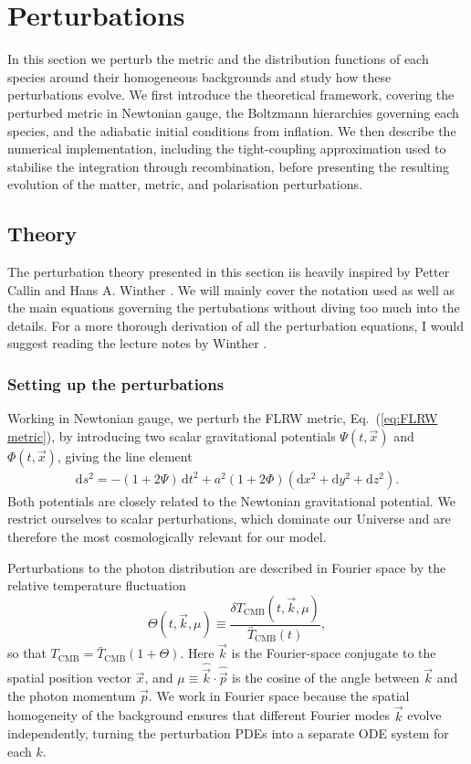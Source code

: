 \documentclass[twocolumn]{aa}
\renewcommand{\d}{\text{d}}
\begin{document}
\section{Perturbations}

 In this section we perturb the metric and the distribution functions of each species around their homogeneous backgrounds and study how these perturbations evolve. We first introduce the theoretical framework, covering the perturbed metric in Newtonian gauge, the Boltzmann hierarchies governing each species, and the adiabatic initial conditions from inflation. We then describe the numerical implementation, including the tight-coupling approximation used to stabilise the integration through recombination, before presenting the resulting evolution of the matter, metric, and polarisation perturbations.


\subsection{Theory}
The perturbation theory presented in this section iis heavily inspired by Petter Callin and Hans A. Winther \citep{callin2006,winther_milestone3,winther_lectures}. We will mainly cover the notation used as well as the main equations governing the pertubations without diving too much into the details. For a more thorough derivation of all the perturbation equations, I would suggest reading the lecture notes by Winther \citep{winther_lectures}.

\subsubsection{Setting up the perturbations}


Working in Newtonian gauge, we perturb the FLRW metric, Eq.~(\ref{eq:FLRW metric}), by introducing two scalar gravitational potentials $\Psi(t,\vec{x})$ and $\Phi(t,\vec{x})$, giving the line element
\begin{align}
    \d s^2 = -(1+2\Psi)\,\d t^2 + a^2(1+2\Phi)\left(\d x^2 + \d y^2 + \d z^2\right).
    \label{eq:pert metric}
\end{align}
Both potentials are closely related to the Newtonian gravitational potential. We restrict ourselves to scalar perturbations, which dominate our Universe and are therefore the most cosmologically relevant for our model.

Perturbations to the photon distribution are described in Fourier space by the relative temperature fluctuation
\begin{equation*}
    \Theta(t,\vec{k},\mu) \equiv \frac{\delta T_\text{CMB}(t,\vec{k},\mu)}{\bar{T}_\text{CMB}(t)},
\end{equation*}
so that $T_\text{CMB} = \bar{T}_\text{CMB}(1+\Theta)$. Here $\vec{k}$ is the Fourier-space conjugate to the spatial position vector $\vec{x}$, and $\mu \equiv \hat{\vec{k}}\cdot\hat{\vec{p}}$ is the cosine of the angle between $\vec{k}$ and the photon momentum $\vec{p}$. We work in Fourier space because the spatial homogeneity of the background ensures that different Fourier modes $\vec{k}$ evolve independently, turning the perturbation PDEs into a separate ODE system for each $k$.
\end{document}
